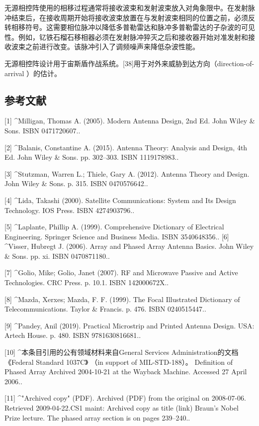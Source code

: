无源相控阵使用的相移过程通常将接收波束和发射波束放入对角象限中。在发射脉冲结束后，在接收周期开始将接收波束放置在与发射波束相同的位置之前，必须反转相移符号。这需要相位脉冲以降低多普勒雷达和脉冲多普勒雷达的子杂波的可见性。例如，钇铁石榴石移相器必须在发射脉冲猝灭之后和接收器开始对准发射和接收波束之前进行改变。该脉冲引入了调频噪声来降低杂波性能。

无源相控阵设计用于宙斯盾作战系统。[38]用于对外来威胁到达方向（direction-of-arrival ）的估计。

\subsection{参考文献}
[1]
^Milligan, Thomas A. (2005). Modern Antenna Design, 2nd Ed. John Wiley & Sons. ISBN 0471720607..

[2]
^Balanis, Constantine A. (2015). Antenna Theory: Analysis and Design, 4th Ed. John Wiley & Sons. pp. 302–303. ISBN 1119178983..

[3]
^Stutzman, Warren L.; Thiele, Gary A. (2012). Antenna Theory and Design. John Wiley & Sons. p. 315. ISBN 0470576642..

[4]
^Lida, Takashi (2000). Satellite Communications: System and Its Design Technology. IOS Press. ISBN 4274903796..

[5]
^Laplante, Phillip A. (1999). Comprehensive Dictionary of Electrical Engineering. Springer Science and Business Media. ISBN 3540648356..
[6]
^Visser, Hubregt J. (2006). Array and Phased Array Antenna Basics. John Wiley & Sons. pp. xi. ISBN 0470871180..

[7]
^Golio, Mike; Golio, Janet (2007). RF and Microwave Passive and Active Technologies. CRC Press. p. 10.1. ISBN 142000672X..

[8]
^Mazda, Xerxes; Mazda, F. F. (1999). The Focal Illustrated Dictionary of Telecommunications. Taylor & Francis. p. 476. ISBN 0240515447..

[9]
^Pandey, Anil (2019). Practical Microstrip and Printed Antenna Design. USA: Artech House. p. 480. ISBN 9781630816681..

[10]
^本条目引用的公有领域材料来自General Services Administration的文档《Federal Standard 1037C》 （in support of MIL-STD-188）。 Definition of Phased Array Archived 2004-10-21 at the Wayback Machine. Accessed 27 April 2006..

[11]
^"Archived copy" (PDF). Archived (PDF) from the original on 2008-07-06. Retrieved 2009-04-22.CS1 maint: Archived copy as title (link) Braun's Nobel Prize lecture. The phased array section is on pages 239–240..

